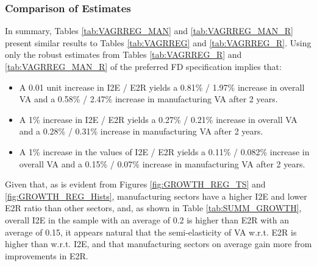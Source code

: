 \documentclass[a4paper]{article}
\begin{document}
\subsubsection{Comparison of Estimates}
In summary, Tables \ref{tab:VAGRREG_MAN} and \ref{tab:VAGRREG_MAN_R} present similar results to Tables \ref{tab:VAGRREG} and \ref{tab:VAGRREG_R}. Using only the robust estimates from Tables \ref{tab:VAGRREG_R} and \ref{tab:VAGRREG_MAN_R} of the preferred FD specification implies that:
\begin{itemize}
\item A 0.01 unit increase in I2E / E2R yields a 0.81\% / 1.97\% increase in overall VA and a 0.58\% / 2.47\% increase in manufacturing VA after 2 years.
\item A 1\% increase in I2E / E2R yields a 0.27\% / 0.21\% increase in overall VA and a 0.28\% / 0.31\% increase in manufacturing VA after 2 years.
\item A 1\% increase in the values of I2E / E2R yields a 0.11\% / 0.082\% increase in overall VA and a 0.15\% / 0.07\% increase in manufacturing VA after 2 years.
\end{itemize}

Given that, as is evident from Figures \ref{fig:GROWTH_REG_TS} and \ref{fig:GROWTH_REG_Hists}, manufacturing sectors have a higher I2E and lower E2R ratio than other sectors, and, as shown in Table \ref{tab:SUMM_GROWTH}, overall I2E in the sample with an average of 0.2 is higher than E2R with an average of 0.15, it appears natural that the semi-elasticity of VA w.r.t. E2R is higher than w.r.t. I2E, and that manufacturing sectors on average gain more from improvements in E2R. 
\end{document}
